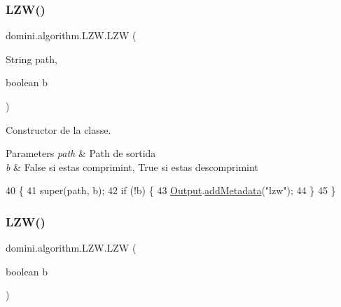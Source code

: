 \subsubsection{\texorpdfstring{L\+Z\+W()}{LZW()}\hspace{0.1cm}{\footnotesize\ttfamily [1/2]}}
{\footnotesize\ttfamily domini.\+algorithm.\+L\+Z\+W.\+L\+ZW (\begin{DoxyParamCaption}\item[{String}]{path,  }\item[{boolean}]{b }\end{DoxyParamCaption})\hspace{0.3cm}{\ttfamily [inline]}}



Constructor de la classe. 


\begin{DoxyParams}{Parameters}
{\em path} & Path de sortida \\
\hline
{\em b} & False si estas comprimint, True si estas descomprimint \\
\hline
\end{DoxyParams}

\begin{DoxyCode}
40                                        \{
41         super(path, b);
42         \textcolor{keywordflow}{if} (!b) \{
43             \hyperlink{classdomini_1_1algorithm_1_1Algorithm_a4de9955411c656325adc391ef570c082}{Output}.\hyperlink{classpersistencia_1_1output_1_1Ctrl__Output_ae6d6857910a023982900ddc857b891f0}{addMetadata}(\textcolor{stringliteral}{"lzw"});
44         \}
45     \}
\end{DoxyCode}
\mbox{\label{classdomini_1_1algorithm_1_1LZW_ad8feac199454cb47321930e6d737360e}} 
\subsubsection{\texorpdfstring{L\+Z\+W()}{LZW()}\hspace{0.1cm}{\footnotesize\ttfamily [2/2]}}
{\footnotesize\ttfamily domini.\+algorithm.\+L\+Z\+W.\+L\+ZW (\begin{DoxyParamCaption}\item[{boolean}]{b }\end{DoxyParamCaption})\hspace{0.3cm}{\ttfamily [inline]}}



